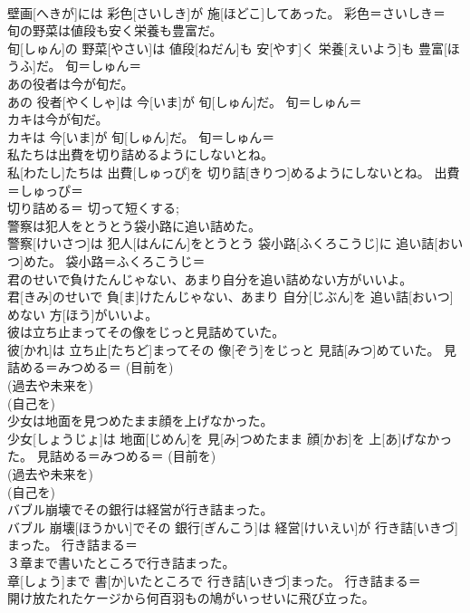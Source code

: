 \documentclass[8pt]{extreport}
\begin{document}
\begin{CJK}{UTF8}{min}
\\	壁画[へきが]には 彩色[さいしき]が 施[ほどこ]してあった。	彩色＝さいしき＝ 
\\	旬の野菜は値段も安く栄養も豊富だ。	
\\	旬[しゅん]の 野菜[やさい]は 値段[ねだん]も 安[やす]く 栄養[えいよう]も 豊富[ほうふ]だ。	旬＝しゅん＝ 
\\	あの役者は今が旬だ。	
\\	あの 役者[やくしゃ]は 今[いま]が 旬[しゅん]だ。	旬＝しゅん＝ 
\\	カキは今が旬だ。	
\\	カキは 今[いま]が 旬[しゅん]だ。	旬＝しゅん＝ 
\\	私たちは出費を切り詰めるようにしないとね。	
\\	私[わたし]たちは 出費[しゅっぴ]を 切り詰[きりつ]めるようにしないとね。	出費＝しゅっぴ＝ 
\\	切り詰める＝ 切って短くする; 
\\	警察は犯人をとうとう袋小路に追い詰めた。	
\\	警察[けいさつ]は 犯人[はんにん]をとうとう 袋小路[ふくろこうじ]に 追い詰[おいつ]めた。	袋小路＝ふくろこうじ＝ 
\\	君のせいで負けたんじゃない、あまり自分を追い詰めない方がいいよ。	
\\	君[きみ]のせいで 負[ま]けたんじゃない、あまり 自分[じぶん]を 追い詰[おいつ]めない 方[ほう]がいいよ。	
\\	彼は立ち止まってその像をじっと見詰めていた。	
\\	彼[かれ]は 立ち止[たちど]まってその 像[ぞう]をじっと 見詰[みつ]めていた。	見詰める＝みつめる＝ (目前を) 
\\	(過去や未来を) 
\\	(自己を) 
\\	少女は地面を見つめたまま顔を上げなかった。	
\\	少女[しょうじょ]は 地面[じめん]を 見[み]つめたまま 顔[かお]を 上[あ]げなかった。	見詰める＝みつめる＝ (目前を) 
\\	(過去や未来を) 
\\	(自己を) 
\\	バブル崩壊でその銀行は経営が行き詰まった。	
\\	バブル 崩壊[ほうかい]でその 銀行[ぎんこう]は 経営[けいえい]が 行き詰[いきづ]まった。	行き詰まる＝ 
\\	３章まで書いたところで行き詰まった。	
\\	章[しょう]まで 書[か]いたところで 行き詰[いきづ]まった。	行き詰まる＝ 
\\	開け放たれたケージから何百羽もの鳩がいっせいに飛び立った。	

\end{CJK}
\end{document}
